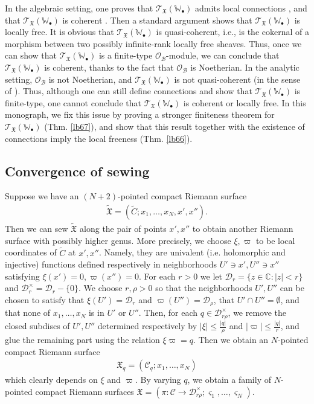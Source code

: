 \documentclass[12pt,b5paper,notitlepage]{report}
\theoremstyle{definition}
\theoremstyle{plain}
\newcommand{\fk}{\mathfrak}
\newcommand{\mc}{\mathcal}
\newcommand{\wtd}{\widetilde}
\newcommand{\scr}{\mathscr}
\newcommand{\sgm}{\varsigma}
\newcommand{\blt}{\bullet}
\newcommand{\Wbb}{\mathbb W}
\newcommand{\Cbb}{\mathbb C}
\numberwithin{equation}{section}
\begin{document}
In the algebraic setting, one proves  that $\scr T_{\fk X}(\Wbb_\blt)$ admits  local connections \cite{FB04,DGT19a}, and that $\scr T_{\fk X}(\Wbb_\blt)$ is coherent \cite{DGT19b}. Then a standard argument shows that $\scr T_{\fk X}(\Wbb_\blt)$ is locally free. It is obvious that $\scr T_{\fk X}(\Wbb_\blt)$ is quasi-coherent, i.e., is the cokernal of a morphism between two possibly infinite-rank locally free sheaves. Thus, once we can show that $\scr T_{\fk X}(\Wbb_\blt)$ is a finite-type $\scr O_{\mc B}$-module, we can conclude that $\scr T_{\fk X}(\Wbb_\blt)$ is coherent, thanks to the fact that $\scr O_{\mc B}$ is Noetherian.  In the analytic setting, $\scr O_{\mc B}$ is not Noetherian, and $\scr T_{\fk X}(\Wbb_\blt)$ is not quasi-coherent (in the sense of \cite{EP96}). Thus, although one can still define connections and show that $\scr T_{\fk X}(\Wbb_\blt)$ is finite-type, one cannot conclude that $\scr T_{\fk X}(\Wbb_\blt)$ is coherent or locally free. In this monograph, we fix this issue by proving a stronger finiteness theorem for $\scr T_{\fk X}(\Wbb_\blt)$ (Thm. \ref{lb67}), and show that this result together with the existence of connections imply the local freeness (Thm. \ref{lb66}).
	



\subsection*{Convergence of sewing}


Suppose  we have an $(N+2)$-pointed compact Riemann surface
\begin{align*}
\wtd{\fk X}=(\wtd C;x_1,\dots,x_N,x',x'').
\end{align*}
Then we can sew $\wtd{\fk X}$ along the pair of points $x',x''$ to obtain another Riemann surface with possibly higher genus. More precisely, we choose $\xi,\varpi$ to be local coordinates of $\wtd C$ at $x',x''$. Namely, they are univalent  (i.e. holomorphic and injective) functions defined respectively in neighborhoods $U'\ni x',U''\ni x''$ satisfying $\xi(x')=0,\varpi(x'')=0$. For each $r>0$ we let $\mc D_r=\{z\in\Cbb:|z|<r\}$ and $\mc D_r^\times=\mc D_r-\{0\}$. We choose $r,\rho>0$ so that the neighborhoods $U',U''$ can be chosen to satisfy that $\xi(U')=\mc D_r$ and $\varpi(U'')=\mc D_\rho$, that  $U'\cap U''=\emptyset$, and that none of $x_1,\dots,x_N$ is in $U'$ or $U''$. Then, for each $q\in\mc D_{r\rho}^\times$, we remove the closed subdiscs of $U',U''$ determined respectively by $|\xi|\leq \frac {|q|}\rho$ and $|\varpi|\leq \frac{|q|}r$, and glue the remaining part using the relation $\xi\varpi=q$. Then we obtain an $N$-pointed compact Riemann surface
\begin{align*}
\fk X_q=(\mc C_q;x_1,\dots,x_N)
\end{align*}
which clearly depends on $\xi$ and $\varpi$. By varying $q$, we obtain a family of $N$-pointed compact Riemann surfaces $\fk X=(\pi:\mc C\rightarrow\mc D_{r\rho}^\times;\sgm_1,\dots,\sgm_N)$.
\end{document}
